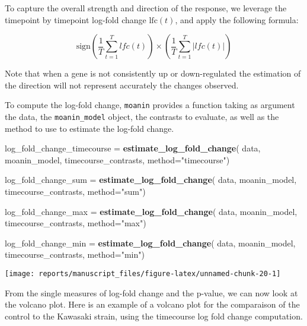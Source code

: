 \documentclass[9pt,a4paper,]{extarticle}
\newenvironment{Shaded}{\begin{snugshade}}{\end{snugshade}}
\newcommand{\DataTypeTok}[1]{\textcolor[rgb]{0.13,0.29,0.53}{#1}}
\newcommand{\KeywordTok}[1]{\textcolor[rgb]{0.13,0.29,0.53}{\textbf{#1}}}
\newcommand{\NormalTok}[1]{#1}
\newcommand{\StringTok}[1]{\textcolor[rgb]{0.31,0.60,0.02}{#1}}
\begin{document}
To capture the overall strength and direction of the response, we leverage the
timepoint by timepoint log-fold change \(\text{lfc}(t)\), and apply the
following formula:

\[\text{sign}\left(\frac{1}{T}\sum_{t = 1}^T lfc(t) \right) \times \left(\frac{1}{T}\sum_{t= 1}^T \lvert {lfc(t)} \lvert \right)\]

Note that when a gene is not consistently up or down-regulated the estimation
of the direction will not represent accurately the changes observed.

To compute the log-fold change, \texttt{moanin} provides a function taking as
argument the data, the \texttt{moanin\_model} object, the contrasts to evaluate, as
well as the method to use to estimate the log-fold change.

\begin{Shaded}
\begin{Highlighting}[]
\NormalTok{log_fold_change_timecourse =}\StringTok{ }\KeywordTok{estimate_log_fold_change}\NormalTok{(}
\NormalTok{    data, moanin_model, timecourse_contrasts,  }\DataTypeTok{method=}\StringTok{"timecourse"}\NormalTok{)}

\NormalTok{log_fold_change_sum =}\StringTok{ }\KeywordTok{estimate_log_fold_change}\NormalTok{(}
\NormalTok{    data, moanin_model, timecourse_contrasts,  }\DataTypeTok{method=}\StringTok{"sum"}\NormalTok{)}

\NormalTok{log_fold_change_max =}\StringTok{ }\KeywordTok{estimate_log_fold_change}\NormalTok{(}
\NormalTok{    data, moanin_model, timecourse_contrasts, }\DataTypeTok{method=}\StringTok{"max"}\NormalTok{)}

\NormalTok{log_fold_change_min =}\StringTok{ }\KeywordTok{estimate_log_fold_change}\NormalTok{(}
\NormalTok{    data, moanin_model, timecourse_contrasts, }\DataTypeTok{method=}\StringTok{"min"}\NormalTok{)}
\end{Highlighting}
\end{Shaded}

\begin{center}\texttt{[image: reports/manuscript\_files/figure-latex/unnamed-chunk-20-1]} \end{center}

From the single measures of log-fold change and the p-value, we can now look
at the volcano plot. Here is an example of a volcano plot for the comparaison
of the control to the Kawasaki strain, using the timecourse log fold change
computation.
\end{document}
